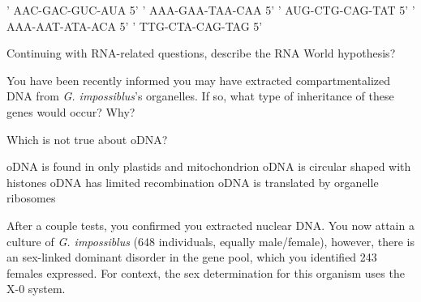 \documentclass[addpoints]{exam}
\begin{document}
\begin{questions}
\begin{choices}
    ' AAC-GAC-GUC-AUA 5'
    ' AAA-GAA-TAA-CAA 5'
    ' AUG-CTG-CAG-TAT 5'
    ' AAA-AAT-ATA-ACA 5'
    ' TTG-CTA-CAG-TAG 5'
\end{choices}

\newpage


\question[3] Continuing with RNA-related questions, describe the RNA World hypothesis? 



\question[5] You have been recently informed you may have extracted compartmentalized DNA from \textit{G. impossiblus}'s organelles. If so, what type of inheritance of these genes would occur? \fillin[Maternal] Why? 


\question[2] Which is not true about oDNA?

\begin{choices}

\choice oDNA is found in only plastids and mitochondrion
\CorrectChoice oDNA is circular shaped with histones
\choice oDNA has limited recombination
\choice oDNA is translated by organelle ribosomes

\end{choices}

\question After a couple tests, you confirmed you extracted nuclear DNA. You now attain a culture of \textit{G. impossiblus} (648 individuals, equally male/female), however, there is an sex-linked dominant disorder in the gene pool, which you identified 243 females expressed. For context, the sex determination for this organism uses the X-0 system.

\begin{parts}


\end{parts}
\end{questions}
\end{document}
